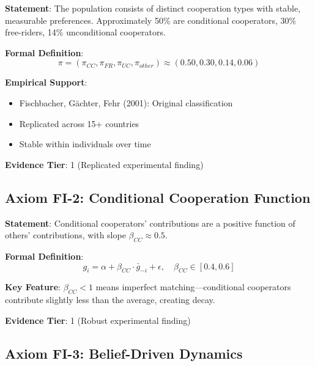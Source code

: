 \begin{tcolorbox}[colback=blue!5!white,colframe=blue!75!black,title=Axiom FI-1: Cooperation Type Heterogeneity]
\textbf{Statement}: The population consists of distinct cooperation types with stable, measurable preferences. Approximately 50\% are conditional cooperators, 30\% free-riders, 14\% unconditional cooperators.

\textbf{Formal Definition}:
\begin{equation}
\pi = (\pi_{CC}, \pi_{FR}, \pi_{UC}, \pi_{other}) \approx (0.50, 0.30, 0.14, 0.06)
\end{equation}

\textbf{Empirical Support}:
\begin{itemize}
    \item Fischbacher, Gächter, Fehr (2001): Original classification
    \item Replicated across 15+ countries
    \item Stable within individuals over time
\end{itemize}

\textbf{Evidence Tier}: 1 (Replicated experimental finding)
\end{tcolorbox}

\subsection{Axiom FI-2: Conditional Cooperation Function}

\begin{tcolorbox}[colback=blue!5!white,colframe=blue!75!black,title=Axiom FI-2: Conditional Cooperation Function]
\textbf{Statement}: Conditional cooperators' contributions are a positive function of others' contributions, with slope $\beta_{CC} \approx 0.5$.

\textbf{Formal Definition}:
\begin{equation}
g_i = \alpha + \beta_{CC} \cdot \bar{g}_{-i} + \epsilon, \quad \beta_{CC} \in [0.4, 0.6]
\end{equation}

\textbf{Key Feature}: $\beta_{CC} < 1$ means imperfect matching---conditional cooperators contribute slightly less than the average, creating decay.

\textbf{Evidence Tier}: 1 (Robust experimental finding)
\end{tcolorbox}

\subsection{Axiom FI-3: Belief-Driven Dynamics}

